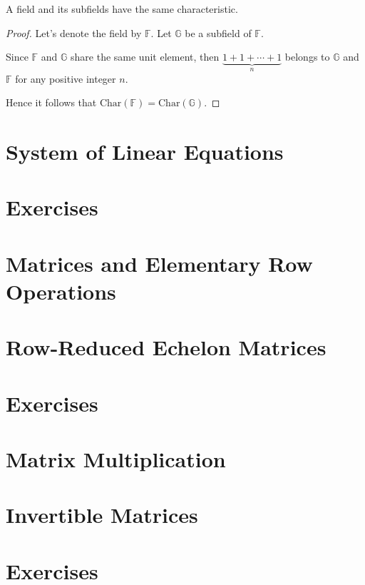 \begin{theorem}
    A field and its subfields have the same characteristic.
\end{theorem}

\begin{proof}
    Let's denote the field by $\mathbb{F}$. Let $\mathbb{G}$ be a subfield of $\mathbb{F}$.

    Since $\mathbb{F}$ and $\mathbb{G}$ share the same unit element, then $\underbrace{1 + 1 + \cdots + 1}_{n}$ belongs to $\mathbb{G}$ and $\mathbb{F}$ for any positive integer $n$.

    Hence it follows that $\text{Char}(\mathbb{F}) = \text{Char}(\mathbb{G})$.
\end{proof}

\section{System of Linear Equations}

\section*{Exercises}

\section{Matrices and Elementary Row Operations}

\section{Row-Reduced Echelon Matrices}

\section*{Exercises}

\section{Matrix Multiplication}

\section{Invertible Matrices}

\section*{Exercises}
